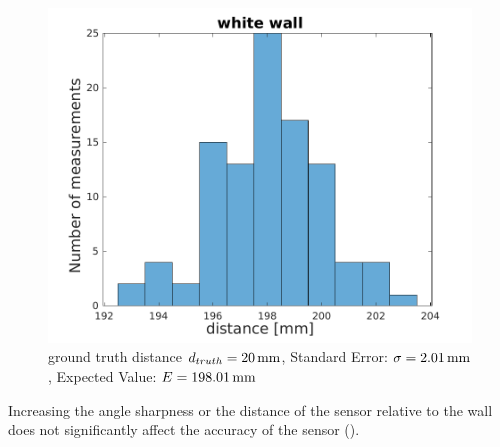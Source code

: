 \begin{figure}
\begin{minipage}{0.3\textwidth}
		\includegraphics[width=0.9\linewidth]{pictures/white_wall.pdf}
		\caption{ground truth distance $d_{truth}= \unit[20]{mm}$, Standard Error: $\sigma=\unit[2.01]{mm}$, Expected Value: $E=\unit[198.01]{mm}$}
		\label{fig:surface_hist_white}
	\end{minipage}
\end{figure}

Increasing the angle sharpness or the distance of the sensor relative to the wall does not significantly affect the accuracy of the sensor ().\\


